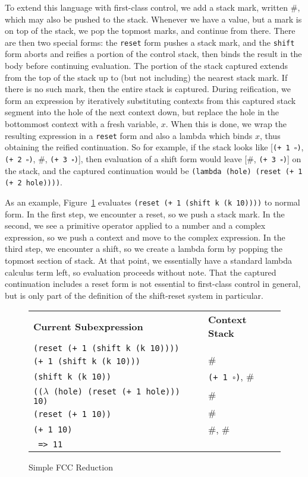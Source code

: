 \documentclass[11pt]{article}
\begin{document}
To extend this language with first-class control, we add a stack mark, written $\#$, which may also be pushed to the stack.
Whenever we have a value, but a mark is on top of the stack, we pop the topmost marks, and continue from there.
There are then two special forms:
the \texttt{reset} form pushes a stack mark, and the \texttt{shift} form aborts and reifies a portion of the control stack, then binds the result in the body before continuing evaluation.
The portion of the stack captured extends from the top of the stack up to (but not including) the nearest stack mark.
If there is no such mark, then the entire stack is captured.
During reification, we form an expression by iteratively substituting contexts from this captured stack segment into the hole of the next context down, but replace the hole in the bottommost context with a fresh variable, $x$.
When this is done, we wrap the resulting expression in a \texttt{reset} form and also a lambda which binds $x$, thus obtaining the reified continuation.
So for example, if the stack looks like [\texttt{(+ 1 $\square$)}, \texttt{(+ 2 $\square$)}, $\#$, \texttt{(+ 3 $\square$)}], then evaluation of a shift form would leave [$\#$, \texttt{(+ 3 $\square$)}] on the stack, and the captured continuation would be \texttt{(lambda (hole) (reset (+ 1 (+ 2 hole))))}.

As an example, Figure~\ref{fig:simple-fcc-reduction} evaluates \texttt{(reset (+ 1 (shift k (k 10))))} to normal form.
In the first step, we encounter a reset, so we push a stack mark.
In the second, we see a primitive operator applied to a number and a complex expression, so we push a context and move to the complex expression.
In the third step, we encounter a shift, so we create a lambda form by popping the topmost section of stack.
At that point, we essentially have a standard lambda calculus term left, so evaluation proceeds without note.
That the captured continuation includes a reset form is not essential to first-class control in general, but is only part of the definition of the shift-reset system in particular.

\begin{figure}[H]
\caption{Simple FCC Reduction}
\label{fig:simple-fcc-reduction}
\begin{tabular}{ll}
\textbf{Current Subexpression} & \textbf{Context Stack} \\
\texttt{(reset (+ 1 (shift k (k 10))))} & \\
\texttt{(+ 1 (shift k (k 10)))} & $\#$ \\
\texttt{(shift k (k 10))} & \texttt{(+ 1 $\square$)}, $\#$ \\
\texttt{(($\lambda$ (hole) (reset (+ 1 hole))) 10)} & $\#$ \\
\texttt{(reset (+ 1 10))} & $\#$ \\
\texttt{(+ 1 10)} & $\#$, $\#$ \\
\texttt{ => 11} \\
\end{tabular}
\end{figure}
\end{document}
